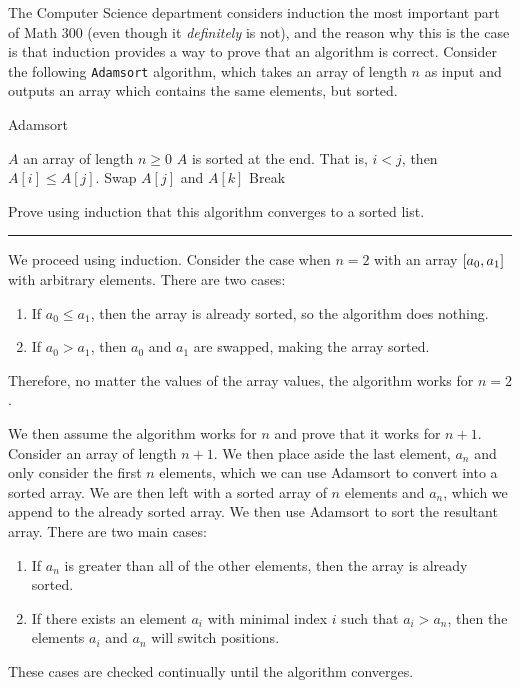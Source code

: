 \documentclass{article}
\begin{document}
The Computer Science department considers induction the most important part of Math 300 (even though it \textit{definitely} is not), and the reason why this is the case is that induction provides a way to prove that an algorithm is correct.
Consider the following \texttt{Adamsort} algorithm, which takes an array of length $n$ as input and outputs an array which contains the same elements, but sorted.
\begin{algorithm}\caption{Adamsort}\begin{algorithmic}
    \Require $A$ an array of length $n\ge 0$
    \Ensure $A$ is sorted at the end. That is, $i<j$, then $A[i]\le A[j]$.
    \State Swap $A[j]$ and $A[k]$
    \Else \State Break 
    \EndIf
    \EndFor
    
  \end{algorithmic}\end{algorithm}
    
Prove using induction that this algorithm converges to a sorted list.
\hrule
We proceed using induction.
Consider the case when $n=2$ with an array $\left [ a_0, a_1 \right]$ with arbitrary elements.
There are two cases:
\begin{enumerate}
\item If $a_0 \leq a_1$, then the array is already sorted, so the algorithm does nothing.
\item If $a_0 > a_1$, then $a_0$ and $a_1$ are swapped, making the array sorted.
\end{enumerate}
Therefore, no matter the values of the array values, the algorithm works for $n=2$.

We then assume the algorithm works for $n$ and prove that it works for $n+1$.
Consider an array of length $n+1$.
We then place aside the last element, $a_n$ and only consider the first $n$ elements, which we can use Adamsort to convert into a sorted array.
We are then left with a sorted array of $n$ elements and $a_n$, which we append to the already sorted array.
We then use Adamsort to sort the resultant array.
There are two main cases:
\begin{enumerate}
\item If $a_n$ is greater than all of the other elements, then the array is already sorted.
\item If there exists an element $a_i$ with minimal index $i$ such that $a_i > a_n$, then the elements $a_i$ and $a_n$ will switch positions.
\end{enumerate}
These cases are checked continually until the algorithm converges.
\end{document}
